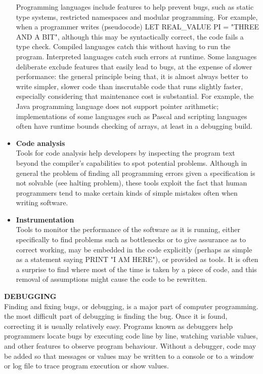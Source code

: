 \begin{itemize}
Programming languages include features to help prevent bugs, such as static type systems, restricted namespaces and modular programming. For example, when a programmer writes (pseudocode) LET REAL\_VALUE PI = "THREE AND A BIT", although this may be syntactically correct, the code fails a type check. Compiled languages catch this without having to run the program. Interpreted languages catch such errors at runtime. Some languages deliberate exclude features that easily lead to bugs, at the expense of slower performance: the general principle being that, it is almost always better to write simpler, slower code than inscrutable code that runs slightly faster, especially considering that maintenance cost is substantial. For example, the Java programming language does not support pointer arithmetic; implementations of some languages such as Pascal and scripting languages often have runtime bounds checking of arrays, at least in a debugging build.
\item \textbf{Code analysis}\\
Tools for code analysis help developers by inspecting the program text beyond the compiler's capabilities to spot potential problems. Although in general the problem of finding all programming errors given a specification is not solvable (see halting problem), these tools exploit the fact that human programmers tend to make certain kinds of simple mistakes often when writing software.
\item \textbf{Instrumentation}\\
Tools to monitor the performance of the software as it is running, either specifically to find problems such as bottlenecks or to give assurance as to correct working, may be embedded in the code explicitly (perhaps as simple as a statement saying PRINT "I AM HERE"), or provided as tools. It is often a surprise to find where most of the time is taken by a piece of code, and this removal of assumptions might cause the code to be rewritten.
\end{itemize}
\textbf{DEBUGGING}\\
Finding and fixing bugs, or debugging, is a major part of computer programming. the most difficult part of debugging is finding the bug. Once it is found, correcting it is usually relatively easy. Programs known as debuggers help programmers locate bugs by executing code line by line, watching variable values, and other features to observe program behaviour. Without a debugger, code may be added so that messages or values may be written to a console or to a window or log file to trace program execution or show values.
